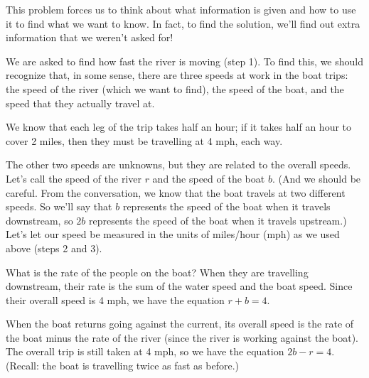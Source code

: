 {This problem forces us to think about what information is given and how to use it to find what we want to know. In fact, to find the solution, we'll find out extra information that we weren't asked for!


We are asked to find how fast the river is moving (step 1). To find this, we should recognize that, in some sense, there are three speeds at work in the boat trips: the speed of the river (which we want to find), the speed of the boat, and the speed that they actually travel at.

We know that each leg of the trip takes half an hour; if it takes half an hour to cover 2 miles, then they must be travelling at 4 mph, each way.

The other two speeds are unknowns, but they are related to the overall speeds. Let's call the speed of the river $r$ and the speed of the boat $b$. (And we should be careful. From the conversation, we know that the boat travels at two different speeds. So we'll say that $b$ represents the speed of the boat when it travels downstream, so $2b$ represents the speed of the boat when it travels upstream.) Let's let our speed be measured in the units of miles/hour (mph) as we used above (steps 2 and 3).


What is the rate of the people on the boat? When they are travelling downstream, their rate is the sum of the water speed and the boat speed. Since their overall speed is 4 mph, we have the equation $r+b=4$. 

When the boat returns going against the current, its overall speed is the rate of the boat minus the rate of the river (since the river is working against the boat). The overall trip is still taken at 4 mph, so we have the equation $2b-r=4$. (Recall: the boat is travelling twice as fast as before.)


}

